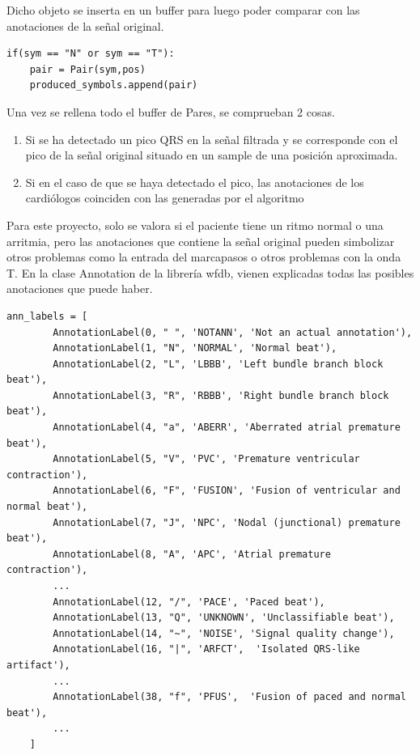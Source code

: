 Dicho objeto se inserta en un buffer para luego poder comparar con las anotaciones de la señal original.

\lstset{language=python, breaklines=true, basicstyle=\footnotesize}
\begin{lstlisting}[frame=single]
if(sym == "N" or sym == "T"):
    pair = Pair(sym,pos)    
    produced_symbols.append(pair)
\end{lstlisting}

Una vez se rellena todo el buffer de Pares, se comprueban 2 cosas.
\begin{enumerate}
	\item Si se ha detectado un pico QRS en la señal filtrada y se
     corresponde con el pico de la señal original situado en un sample de una posición aproximada.
	\item Si en el caso de que se haya detectado el pico, las anotaciones de los cardiólogos coinciden
     con las generadas por el algoritmo
\end{enumerate} 

Para este proyecto, solo se valora si el paciente tiene un ritmo normal o una arritmia, pero las anotaciones
que contiene la señal original pueden simbolizar otros problemas como la entrada del marcapasos o otros problemas con la onda T.
En la clase Annotation de la librería wfdb, vienen explicadas todas las posibles anotaciones que puede haber.
\lstset{language=python, breaklines=true, basicstyle=\footnotesize}
\begin{lstlisting}[frame=single]
    ann_labels = [
        AnnotationLabel(0, " ", 'NOTANN', 'Not an actual annotation'),
        AnnotationLabel(1, "N", 'NORMAL', 'Normal beat'),
        AnnotationLabel(2, "L", 'LBBB', 'Left bundle branch block beat'),
        AnnotationLabel(3, "R", 'RBBB', 'Right bundle branch block beat'),
        AnnotationLabel(4, "a", 'ABERR', 'Aberrated atrial premature beat'),
        AnnotationLabel(5, "V", 'PVC', 'Premature ventricular contraction'),
        AnnotationLabel(6, "F", 'FUSION', 'Fusion of ventricular and normal beat'),
        AnnotationLabel(7, "J", 'NPC', 'Nodal (junctional) premature beat'),
        AnnotationLabel(8, "A", 'APC', 'Atrial premature contraction'),
        ...
        AnnotationLabel(12, "/", 'PACE', 'Paced beat'),
        AnnotationLabel(13, "Q", 'UNKNOWN', 'Unclassifiable beat'),
        AnnotationLabel(14, "~", 'NOISE', 'Signal quality change'),
        AnnotationLabel(16, "|", 'ARFCT',  'Isolated QRS-like artifact'),
        ...
        AnnotationLabel(38, "f", 'PFUS',  'Fusion of paced and normal beat'),
        ...
    ]
\end{lstlisting}


